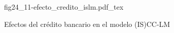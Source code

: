 \begin{figure}[h]
\centering
\def\svgwidth{0.5\textwidth}
{fig24_11-efecto_credito_islm.pdf_tex}
\caption{Efectos del crédito bancario en el modelo (IS)CC-LM}
\label{fig24_11-efecto_credito_islm}
\end{figure}